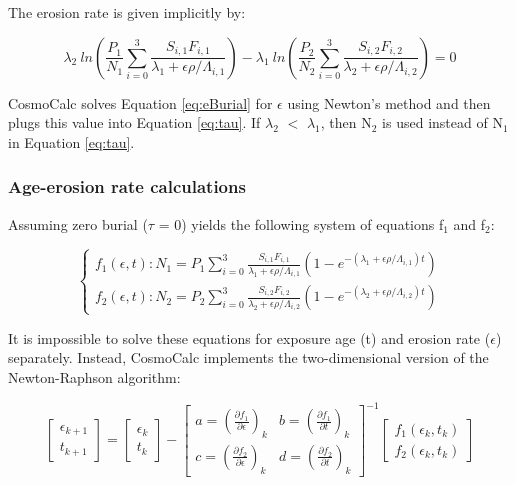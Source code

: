 \documentclass{article}
\begin{document}
The erosion rate is given implicitly by:

\begin{equation}
  \label{eq:eBurial}
  \lambda_2 ~ln\left(\frac{P_1}{N_1} \sum_{i=0}^3 
      \frac{S_{i,1} F_{i,1}}{\lambda_1 + \epsilon \rho / \Lambda_{i,1}}\right)
- \lambda_1 ~ln\left(\frac{P_2}{N_2} \sum_{i=0}^3 
      \frac{S_{i,2} F_{i,2}}{\lambda_2 + \epsilon \rho / \Lambda_{i,2}}\right) = 0
\end{equation}

CosmoCalc  solves  Equation   \ref{eq:eBurial}  for  $\epsilon$  using
Newton's method and then plugs  this value into Equation \ref{eq:tau}. 
If $\lambda_2$ $<$ $\lambda_1$, then N$_2$ is used instead of N$_1$ in
Equation \ref{eq:tau}.

\subsubsection{Age-erosion rate calculations}\label{sec:age-erosion}

Assuming  zero burial  ($\tau$ =  0)  yields the  following system  of
equations f$_1$ and f$_2$:

\begin{equation}
\label{eq:ageErosionSystem}
\left\{
\begin{array}{l}
f_1(\epsilon,t):  N_1 = P_1 \sum_{i=0}^3\frac{S_{i,1} F_{i,1}}{\lambda_1 + \epsilon \rho / \Lambda_{i,1}} 
    \left( 1 - e^{- \left( \lambda_1 + \epsilon \rho / \Lambda_{i,1} \right) t} \right)\\
f_2(\epsilon,t):  N_2 = P_2 \sum_{i=0}^3\frac{S_{i,2} F_{i,2}}{\lambda_2 + \epsilon \rho / \Lambda_{i,2}} 
    \left( 1 - e^{- \left( \lambda_2 + \epsilon \rho / \Lambda_{i,2} \right) t} \right)
\end{array}\right.
\end{equation}

It is  impossible to  solve these equations  for exposure age  (t) and
erosion  rate ($\epsilon$)  separately. Instead,  CosmoCalc implements
the two-dimensional  version of  the Newton-Raphson algorithm:

\begin{equation}
  \label{eq:2dNewton}
\begin{bmatrix}
\epsilon_{k+1}\\ 
t_{k+1}
\end{bmatrix}
=
\begin{bmatrix}
\epsilon_{k}\\ 
t_{k}
\end{bmatrix}
-
\begin{bmatrix}
a = \left(\frac{\partial f_1}{\partial \epsilon}\right)_k & 
b = \left(\frac{\partial f_1}{\partial t}\right)_k\\
c = \left(\frac{\partial f_2}{\partial \epsilon}\right)_k & 
d = \left(\frac{\partial f_2}{\partial t}\right)_k
\end{bmatrix}^{-1}
\begin{bmatrix}
f_1(\epsilon_k,t_k)\\
f_2(\epsilon_k,t_k)
\end{bmatrix}
\end{equation}
\end{document}
